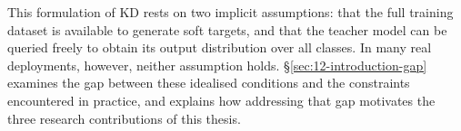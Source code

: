 \begin{foldable}
  This formulation of \ac{KD} rests on two implicit assumptions: that the full training dataset is available to generate soft targets, and that the teacher model can be queried freely to obtain its output distribution over all classes.
  In many real deployments, however, neither assumption holds.
  \S\ref{sec:12-introduction-gap} examines the gap between these idealised conditions and the constraints encountered in practice, and explains how addressing that gap motivates the three research contributions of this thesis.
\end{foldable}
